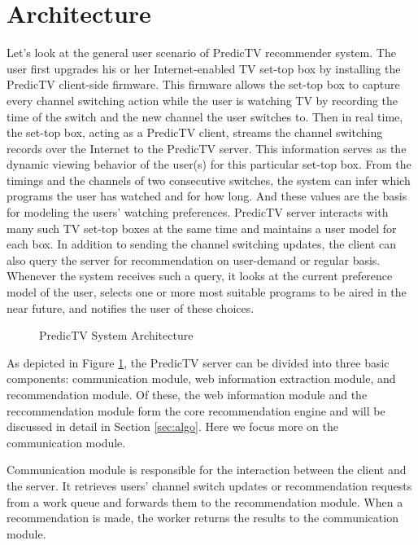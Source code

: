 \section{Architecture}
\label{sec:archi}
Let's look at the general user scenario of PredicTV recommender system.
The user first upgrades his or her Internet-enabled TV set-top box by
installing the PredicTV client-side firmware.
This firmware allows the set-top box to capture every channel switching
action while the user is watching TV by recording the time of the switch
and the new channel the user switches to. Then in real time, the set-top
box, acting as a PredicTV client, streams the channel switching records over
the Internet to the PredicTV server. This information serves as the
dynamic viewing behavior of the user(s) for this particular set-top box.
From the timings and the channels of two consecutive switches,
the system can infer which programs the user has watched and for how long.
And these values are the basis for modeling the users' watching preferences.
PredicTV server interacts with many such TV set-top boxes at the same time
and maintains a user model for each box. In addition to sending the
channel switching updates, the client can also query the server for
recommendation on user-demand or regular basis. Whenever the system receives
such a query, it looks at the current preference model of the user,
selects one or more most suitable programs to be aired in the near future,
and notifies the user of these choices.

\begin{figure}[h]
\begin{center}
\caption{PredicTV System Architecture}
\label{fig:archi}
\end{center}
\end{figure}

As depicted in Figure \ref{fig:archi}, the PredicTV server
can be divided into three basic components: communication module,
web information extraction module, and recommendation module.
Of these, the web information module and the reccommendation module
form the core recommendation engine and will be discussed in
detail in Section \ref{sec:algo}. Here we focus more on the communication
module.

Communication module is responsible for the interaction between the
client and the server. It retrieves users' channel switch
updates or recommendation requests from a work queue and forwards them to the
recommendation module. When a recommendation is made, the worker returns
the results to the communication module.

